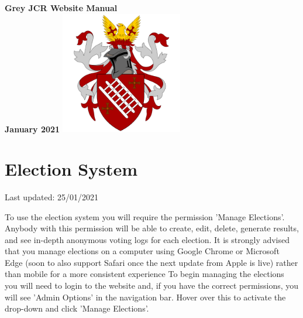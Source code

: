 \documentclass{article}
\begin{document}
\begin{titlepage}
    \begin{center}
        \vspace*{1cm}
        \Huge
        \textbf{Grey JCR Website Manual}
        \\
        \vspace{1cm}
        \LARGE
        \textbf{January 2021}
        \vfill
        \includegraphics[width=0.4\textwidth]{logo512.png}
    \end{center}
\end{titlepage}

\newpage
\tableofcontents
\newpage

\section{Election System}
Last updated: 25/01/2021

To use the election system you will require the permission 'Manage Elections'. Anybody with this permission will be able to create, edit, delete, generate results, and see in-depth anonymous voting logs for each election. It is strongly advised that you manage elections on a computer using Google Chrome or Microsoft Edge (soon to also support Safari once the next update from Apple is live) rather than mobile for a more consistent experience To begin managing the elections you will need to login to the website and, if you have the correct permissions, you will see 'Admin Options' in the navigation bar. Hover over this to activate the drop-down and click 'Manage Elections'.
\end{document}
